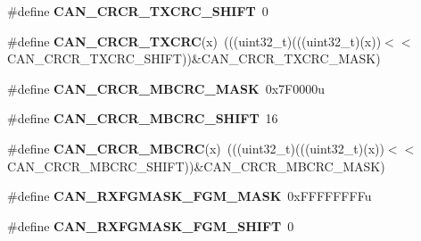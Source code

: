 \begin{DoxyCompactItemize}
\item 
\#define {\bfseries C\+A\+N\+\_\+\+C\+R\+C\+R\+\_\+\+T\+X\+C\+R\+C\+\_\+\+S\+H\+I\+FT}~0\hypertarget{group__CAN__Register__Masks_ga56fca714ec47e9786fdf7e9378c660aa}{}\label{group__CAN__Register__Masks_ga56fca714ec47e9786fdf7e9378c660aa}

\item 
\#define {\bfseries C\+A\+N\+\_\+\+C\+R\+C\+R\+\_\+\+T\+X\+C\+RC}(x)~(((uint32\+\_\+t)(((uint32\+\_\+t)(x))$<$$<$C\+A\+N\+\_\+\+C\+R\+C\+R\+\_\+\+T\+X\+C\+R\+C\+\_\+\+S\+H\+I\+FT))\&C\+A\+N\+\_\+\+C\+R\+C\+R\+\_\+\+T\+X\+C\+R\+C\+\_\+\+M\+A\+SK)\hypertarget{group__CAN__Register__Masks_ga2c7cb04502b4f8ab4f5e005dc3512ba2}{}\label{group__CAN__Register__Masks_ga2c7cb04502b4f8ab4f5e005dc3512ba2}

\item 
\#define {\bfseries C\+A\+N\+\_\+\+C\+R\+C\+R\+\_\+\+M\+B\+C\+R\+C\+\_\+\+M\+A\+SK}~0x7\+F0000u\hypertarget{group__CAN__Register__Masks_ga8b17ddaa608ead97f25b59e5919d079c}{}\label{group__CAN__Register__Masks_ga8b17ddaa608ead97f25b59e5919d079c}

\item 
\#define {\bfseries C\+A\+N\+\_\+\+C\+R\+C\+R\+\_\+\+M\+B\+C\+R\+C\+\_\+\+S\+H\+I\+FT}~16\hypertarget{group__CAN__Register__Masks_ga1d18c789e52dbae45dc581a3327a1bde}{}\label{group__CAN__Register__Masks_ga1d18c789e52dbae45dc581a3327a1bde}

\item 
\#define {\bfseries C\+A\+N\+\_\+\+C\+R\+C\+R\+\_\+\+M\+B\+C\+RC}(x)~(((uint32\+\_\+t)(((uint32\+\_\+t)(x))$<$$<$C\+A\+N\+\_\+\+C\+R\+C\+R\+\_\+\+M\+B\+C\+R\+C\+\_\+\+S\+H\+I\+FT))\&C\+A\+N\+\_\+\+C\+R\+C\+R\+\_\+\+M\+B\+C\+R\+C\+\_\+\+M\+A\+SK)\hypertarget{group__CAN__Register__Masks_gaab5690dca6900f95d513ea5178e1ad25}{}\label{group__CAN__Register__Masks_gaab5690dca6900f95d513ea5178e1ad25}

\item 
\#define {\bfseries C\+A\+N\+\_\+\+R\+X\+F\+G\+M\+A\+S\+K\+\_\+\+F\+G\+M\+\_\+\+M\+A\+SK}~0x\+F\+F\+F\+F\+F\+F\+F\+Fu\hypertarget{group__CAN__Register__Masks_ga5db0253c73d24a846f3f3ce6cd67e74c}{}\label{group__CAN__Register__Masks_ga5db0253c73d24a846f3f3ce6cd67e74c}

\item 
\#define {\bfseries C\+A\+N\+\_\+\+R\+X\+F\+G\+M\+A\+S\+K\+\_\+\+F\+G\+M\+\_\+\+S\+H\+I\+FT}~0\hypertarget{group__CAN__Register__Masks_ga65e590b20d692e367f4ee9dc8a4585e2}{}\label{group__CAN__Register__Masks_ga65e590b20d692e367f4ee9dc8a4585e2}


\end{DoxyCompactItemize}
